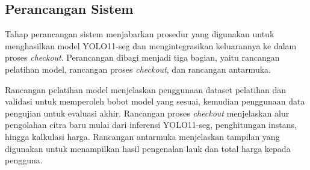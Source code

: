 \subsection{Perancangan Sistem}

Tahap perancangan sistem menjabarkan prosedur yang digunakan untuk menghasilkan model YOLO11-seg dan mengintegrasikan keluarannya ke dalam proses \textit{checkout}. Perancangan dibagi menjadi tiga bagian, yaitu rancangan pelatihan model, rancangan proses \textit{checkout}, dan rancangan antarmuka.

Rancangan pelatihan model menjelaskan penggunaan dataset pelatihan dan validasi untuk memperoleh bobot model yang sesuai, kemudian penggunaan data pengujian untuk evaluasi akhir. Rancangan proses \textit{checkout} menjelaskan alur pengolahan citra baru mulai dari inferensi YOLO11-seg, penghitungan instans, hingga kalkulasi harga. Rancangan antarmuka menjelaskan tampilan yang digunakan untuk menampilkan hasil pengenalan lauk dan total harga kepada pengguna.




